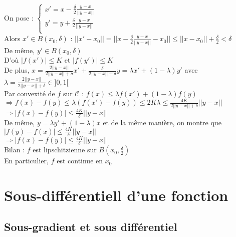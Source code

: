 \documentclass[12pt,a4paper]{article}
\begin{document}
{On pose :
$\begin{cases}
    x' = x - \frac{\delta}{2} \frac{y - x}{||y - x||}\\
    y' = y + \frac{\delta}{2} \frac{y - x}{||y - x||}\\
\end{cases}$\\

Alors $x' \in B(x_0, \delta)$ : $||x' - x_0|| = ||x - \frac{\delta}{2} \frac{y - x}{||y - x||} - x_0|| \leq ||x - x_0|| + \frac{\delta}{2} < \delta$\\
De même, $y' \in B(x_0, \delta)$\\

D'où $|f(x')| \leq K$ et $|f(y')| \leq K$\\

De plus, $x = \frac{2 ||y - x||}{2 ||y - x|| + \delta} x' + \frac{\delta}{2 ||y - x|| + \delta} y = \lambda x' + (1 - \lambda) y'$ avec $\lambda = \frac{2 ||y - x||}{2 ||y - x|| + \delta} \in ]0, 1[$\\

Par convexité de $f$ sur $\mathcal{C}$ : $f(x) \leq \lambda f(x') + (1 - \lambda) f(y)$\\
$\Rightarrow f(x) - f(y) \leq \lambda (f(x') - f(y)) \leq 2K\lambda \leq \frac{4K}{2 ||y - x|| + \delta} ||y - x||$\\
$\Rightarrow |f(x) - f(y)| \leq \frac{4K}{\delta} ||y - x||$\\

De même, $y = \lambda y' + (1 - \lambda) x$ et de la même manière, on montre que $|f(y) - f(x)| \leq \frac{4K}{\delta} ||y - x||$\\
$\Rightarrow |f(x) - f(y)| \leq \frac{4K}{\delta} ||y - x||$\\

Bilan : $f$ est lipschitzienne sur $B(x_0, \frac{\delta}{2})$\\
En particulier, $f$ est continue en $x_0$\\
}





\section{Sous-différentiell d'une fonction}

\subsection{Sous-gradient et sous différentiel}
\end{document}
